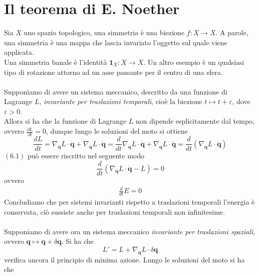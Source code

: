 \documentclass{article}
\begin{document}
\newpage
\section{Il teorema di E. Noether}
Sia $X$ uno spazio topologico, una simmetria è una biezione $f : X \longrightarrow X$. A parole, una simmetria è una mappa che lascia invariato l'oggetto sul quale viene applicata. \\
Una simmetria banale è l'identità $\mathbf{1}_X : X \longrightarrow X$. Un altro esempio è un qualsiasi tipo di rotazione attorno ad un asse passante per il centro di una sfera. \\ \\
Supponiamo di avere un sistema meccanico, descritto da una funzione di Lagrange $L$, \textit{invariante per traslazioni temporali}, cioè la biezione $t \mapsto t + \varepsilon$, dove $\varepsilon > 0$. \\
Allora si ha che la funzione di Lagrange $L$ non dipende esplicitamente dal tempo, ovvero $\frac{\partial L}{\partial t} = 0$, dunque lungo le soluzioni del moto si ottiene
\begin{equation}
    \frac{dL}{dt} = \nabla_{\mathbf{q}}L \cdot \dot{\mathbf{q}} + \nabla_{\dot{\mathbf{q}}}L \cdot \ddot{\mathbf{q}} = \frac{d}{dt}\nabla_{\dot{\mathbf{q}}}L \cdot \dot{\mathbf{q}} + \nabla_{\dot{\mathbf{q}}}L \cdot \ddot{\mathbf{q}} = \frac{d}{dt}\left(\nabla_{\dot{\mathbf{q}}}L \cdot \dot{\mathbf{q}}\right) \tag{6.1}
\end{equation}
$(6.1)$ può essere riscritto nel seguente modo
\begin{equation}
    \frac{d}{dt}\left(\nabla_{\dot{\mathbf{q}}}L \cdot \dot{\mathbf{q}} - L\right) = 0 \tag{6.2}
\end{equation}
ovvero
\begin{align}
    \frac{d}{dt}E = 0 \tag{6.3}
\end{align}
Concludiamo che per sistemi invarianti rispetto a traslazioni temporali l'energia è conservata, ciò sussiste anche per traslazioni temporali non infinitesime. \\ \\
Supponiamo di avere ora un sistema meccanico \textit{invariante per traslazioni spaziali}, ovvero $\mathbf{q} \mapsto \mathbf{q} + \delta\mathbf{q}$. Si ha che
\begin{equation}
    L' = L + \nabla_{\mathbf{q}}L \cdot \delta\mathbf{q} \tag{6.4}
\end{equation}
verifica ancora il principio di minima azione. Lungo le soluzioni del moto si ha che
\end{document}

